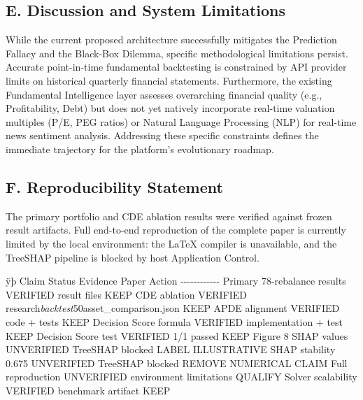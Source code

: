 \documentclass[
]{article}
\begin{document}
\subsection{E. Discussion and System
Limitations}\label{e.-discussion-and-system-limitations}

While the current proposed architecture successfully mitigates the
Prediction Fallacy and the Black-Box Dilemma, specific methodological
limitations persist. Accurate point-in-time fundamental backtesting is
constrained by API provider limits on historical quarterly financial
statements. Furthermore, the existing Fundamental Intelligence layer
assesses overarching financial quality (e.g., Profitability, Debt) but
does not yet natively incorporate real-time valuation multiples (P/E,
PEG ratios) or Natural Language Processing (NLP) for real-time news
sentiment analysis. Addressing these specific constraints defines the
immediate trajectory for the platform's evolutionary roadmap.

\subsection{F. Reproducibility
Statement}\label{f.-reproducibility-statement}

The primary portfolio and CDE ablation results were verified against
frozen result artifacts. Full end-to-end reproduction of the complete
paper is currently limited by the local environment: the LaTeX compiler
is unavailable, and the TreeSHAP pipeline is blocked by host Application
Control.

ÿþ\textbar   C l a i m   \textbar   S t a t u s   \textbar   E v i d e n c e   \textbar   P a p e r   A c t i o n 
 \textbar    \textbar - - - \textbar - - - \textbar - - - \textbar - - - \textbar    \textbar 
 P r i m a r y   7 8 - r e b a l a n c e   r e s u l t s   \textbar   V E R I F I E D   \textbar   r e s u l t   f i l e s 
 \textbar   K E E P   \textbar    \textbar   C D E   a b l a t i o n   \textbar   V E R I F I E D   \textbar 
 r e s e a r c h \emph{ b a c k t e s t } 5 0 a s s e t \_ c o m p a r i s o n . j s o n   \textbar   K E E P   \textbar  
 \textbar   A P D E   a l i g n m e n t   \textbar   V E R I F I E D   \textbar   c o d e   +   t e s t s   \textbar 
 K E E P   \textbar    \textbar   D e c i s i o n   S c o r e   f o r m u l a   \textbar   V E R I F I E D   \textbar 
 i m p l e m e n t a t i o n   +   t e s t   \textbar   K E E P   \textbar    \textbar   D e c i s i o n   S c o r e 
 t e s t   \textbar   V E R I F I E D   \textbar   1 / 1   p a s s e d   \textbar   K E E P   \textbar  
 \textbar   F i g u r e   8   S H A P   v a l u e s   \textbar   U N V E R I F I E D   \textbar   T r e e S H A P 
 b l o c k e d   \textbar   L A B E L   I L L U S T R A T I V E   \textbar    \textbar   S H A P   s t a b i l i t y 
 0 . 6 7 5   \textbar   U N V E R I F I E D   \textbar   T r e e S H A P   b l o c k e d   \textbar   R E M O V E 
 N U M E R I C A L   C L A I M   \textbar    \textbar   F u l l   r e p r o d u c t i o n   \textbar   U N V E R I F I E D 
 \textbar   e n v i r o n m e n t   l i m i t a t i o n s   \textbar   Q U A L I F Y   \textbar    \textbar 
 S o l v e r   s c a l a b i l i t y   \textbar   V E R I F I E D   \textbar   b e n c h m a r k   a r t i f a c t 
 \textbar   K E E P   \textbar    
\end{document}
